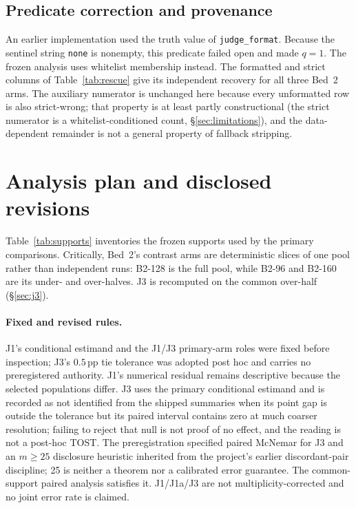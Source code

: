 \documentclass{article}
\newcommand{\pp}{\,\mathrm{pp}}
\begin{document}
\subsection{Predicate correction and provenance}

An earlier implementation used the truth value of
\texttt{judge\_format}.  Because the sentinel string \texttt{none} is
nonempty, this predicate failed open and made $q=1$.  The frozen analysis uses
whitelist membership instead.  The formatted and strict columns of
Table~\ref{tab:rescue} give its independent recovery for all three Bed~2 arms.
The auxiliary
numerator is unchanged here because every unformatted row is also strict-wrong;
that property is at least partly constructional (the strict numerator is a
whitelist-conditioned count, \S\ref{sec:limitations}), and the data-dependent
remainder is not a general property of fallback stripping.

\section{Analysis plan and disclosed revisions}
\label{sec:analysis}

Table~\ref{tab:supports} inventories the frozen supports used by the primary
comparisons.  Critically, Bed~2's contrast arms are deterministic slices of one
pool rather than independent runs: \textsc{B2-128} is the full pool, while
\textsc{B2-96} and \textsc{B2-160} are its under- and over-halves.  J3 is recomputed
on the common over-half (\S\ref{sec:j3}).

\paragraph{Fixed and revised rules.}
J1's conditional estimand and the J1/J3 primary-arm roles were fixed before
inspection; J3's $0.5\pp$ tie tolerance was adopted post hoc and carries no
preregistered authority.  J1's numerical residual remains descriptive because
the selected populations differ.  J3 uses the primary conditional estimand and is
recorded as not identified from the shipped summaries when its point gap is
outside the tolerance but its paired interval contains zero at much coarser
resolution; failing to reject that null is not proof of no effect, and the
reading is not a post-hoc TOST.
The preregistration specified paired McNemar for J3 and an $m\geq25$ disclosure
heuristic inherited from the project's earlier discordant-pair discipline;
25 is neither a theorem nor a calibrated error guarantee.  The common-support
paired analysis satisfies it.  J1/J1a/J3 are not multiplicity-corrected and no
joint error rate is claimed.
\end{document}
